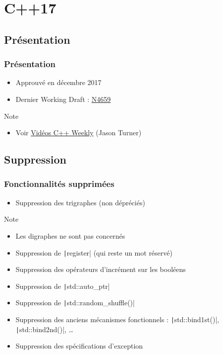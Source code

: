 \documentclass[C++.tex]{subfiles}
\begin{document}
\section{C++17}
\subsection*{Présentation}
\begin{frame}
	\frametitle{Présentation}
	\begin{itemize}
		\item Approuvé en décembre 2017
		\item Dernier Working Draft : \href{http://www.open-std.org/jtc1/sc22/wg21/docs/papers/2017/n4659.pdf}{N4659}
	\end{itemize}

	\begin{block}{Note}
		\begin{itemize}
			\item Voir \href{https://www.youtube.com/user/lefticus1/videos}{Vidéos C++ Weekly} (Jason Turner)
		\end{itemize}
	\end{block}
\end{frame}

\subsection*{Suppression}
\begin{frame}[fragile]
	\frametitle{Fonctionnalités supprimées}
	\begin{itemize}
		\item Suppression des trigraphes (non dépréciés)
	\end{itemize}

	\begin{block}{Note}
		\begin{itemize}
			\item Les digraphes ne sont pas concernés
		\end{itemize}
	\end{block}

	\begin{itemize}
		\item Suppression de \texttt|register| (qui reste un mot réservé)
		\item Suppression des opérateurs d'incrément sur les booléens


		\item Suppression de \texttt|std::auto_ptr|
		\item Suppression de \texttt|std::random_shuffle()|
		\item Suppression des anciens mécanismes fonctionnels : \texttt|std::bind1st()|, \texttt|std::bind2nd()|, \ldots{}
		\item Suppression des spécifications d'exception
	\end{itemize}
\end{frame}
\end{document}
